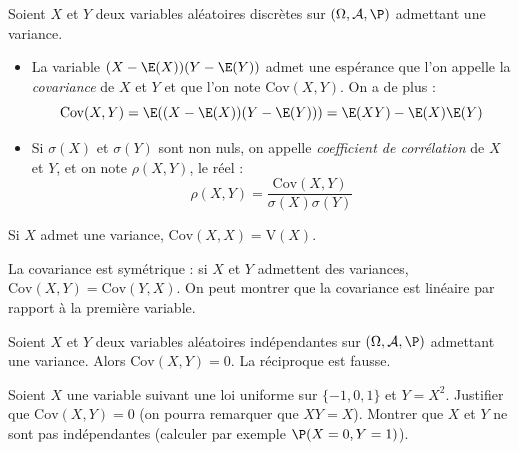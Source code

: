 \documentclass[a4paper,10pt]{report}
\begin{document}
\begin{preuve}
\vspace{3cm}
\end{preuve}


\begin{defip} 
Soient $X$ et $Y$ deux variables aléatoires discrètes sur $(\Omega, \mathcal{A}, \P)$ admettant une variance.
\begin{itemize}
\item La variable $(X-\E(X))(Y-\E(Y))$ admet une espérance que l'on appelle la \textit{covariance} de $X$ et $Y$ et que l'on note $\textrm{Cov}(X,Y)$. On a de plus :
$$ \textrm{Cov}(X,Y) = \E((X-\E(X))(Y-\E(Y))) = \E(XY) - \E(X)\E(Y)$$
\item Si $\sigma(X)$ et $\sigma(Y)$ sont non nuls, on appelle \textit{coefficient de corrélation} de $X$ et $Y$, et on note $\rho(X,Y)$, le réel :
$$ \rho(X,Y) = \dfrac{\textrm{Cov}(X,Y)}{\sigma(X) \sigma(Y)}$$
\end{itemize}
\end{defip}

\begin{preuve}
\vspace{6cm}
\end{preuve}

\begin{rems}
\item Si $X$ admet une variance, $\textrm{Cov}(X,X)= \textrm{V}(X)$.
\item La covariance est symétrique : si $X$ et $Y$ admettent des variances, $\textrm{Cov}(X,Y) = \textrm{Cov}(Y,X)$. On peut montrer que la covariance est linéaire par rapport à la première variable.
\end{rems}

\begin{prop} Soient $X$ et $Y$ deux variables aléatoires indépendantes sur $(\Omega, \mathcal{A}, \P)$ admettant une variance. Alors $\textrm{Cov}(X,Y)=0$. La réciproque est fausse.
\end{prop}

\begin{preuve}

\vspace{1cm}
\end{preuve}

\begin{exa} Soient $X$ une variable suivant une loi uniforme sur $\lbrace -1,0,1 \rbrace$ et $Y=X^2$. Justifier que $\textrm{Cov}(X,Y)=0$ (on pourra remarquer que $XY=X$). Montrer que $X$ et $Y$ ne sont pas indépendantes (calculer par exemple $\P(X=0, Y=1)$).
\end{exa}
\end{document}
